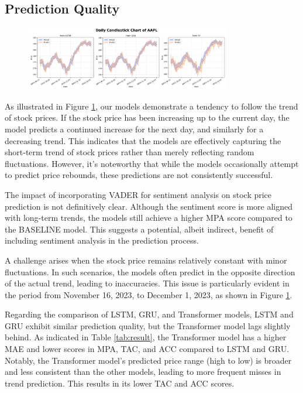 \subsection{Prediction Quality}

\begin{figure}
	\centering
	\includegraphics[width=0.8\textwidth]{Fig/unstable_AAPL.png}
	\caption{}{}
	\label{fig:AAPL}
\end{figure}

As illustrated in Figure \ref{fig:AAPL}, our models demonstrate a tendency to follow the trend of stock prices. 
If the stock price has been increasing up to the current day, the model predicts a continued increase for the next day, and similarly for a decreasing trend. 
This indicates that the models are effectively capturing the short-term trend of stock prices rather than merely reflecting random fluctuations. 
However, it's noteworthy that while the models occasionally attempt to predict price rebounds, these predictions are not consistently successful.

The impact of incorporating VADER for sentiment analysis on stock price prediction is not definitively clear. 
Although the sentiment score is more aligned with long-term trends, the models still achieve a higher MPA score compared to the BASELINE model. 
This suggests a potential, albeit indirect, benefit of including sentiment analysis in the prediction process.

A challenge arises when the stock price remains relatively constant with minor fluctuations. 
In such scenarios, the models often predict in the opposite direction of the actual trend, leading to inaccuracies. 
This issue is particularly evident in the period from November 16, 2023, to December 1, 2023, as shown in Figure \ref{fig:AAPL}.

Regarding the comparison of LSTM, GRU, and Transformer models, LSTM and GRU exhibit similar prediction quality, but the Transformer model lags slightly behind. 
As indicated in Table \ref{tab:result}, the Transformer model has a higher MAE and lower scores in MPA, TAC, and ACC compared to LSTM and GRU. 
Notably, the Transformer model's predicted price range (high to low) is broader and less consistent than the other models, leading to more frequent misses in trend prediction. This results in its lower TAC and ACC scores.

